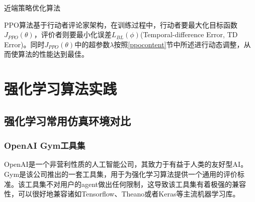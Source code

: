 \documentclass[bachelor]{thesis-uestc}
\begin{document}
	\begin{algorithm}[H]
		\caption{近端策略优化算法}
		\label{al1}
	\end{algorithm}
	
	PPO算法基于行动者评论家架构，在训练过程中，行动者要最大化目标函数$J_{PPO}(\theta)$，评价者则要最小化误差$L_{BL}(\phi)$(Temporal-difference Error, TD Error)。同时$J_{PPO}(\theta)$中的超参数$\lambda$按照\ref{ppocontent}节中所述进行动态调整，从而使算法的性能达到最佳。
	
	\chapter{强化学习算法实践}
	\section{强化学习常用仿真环境对比}
	\subsection{OpenAI Gym工具集}
	OpenAI是一个非营利性质的人工智能公司，其致力于有益于人类的友好型AI。Gym是该公司推出的一套工具集，用于为强化学习算法提供一个通用的评价标准。该工具集不对用户的agent做出任何限制，这导致该工具集有着极强的兼容性，可以很好地兼容诸如Tensorflow、Theano或者Keras等主流机器学习库。
	
\end{document}
